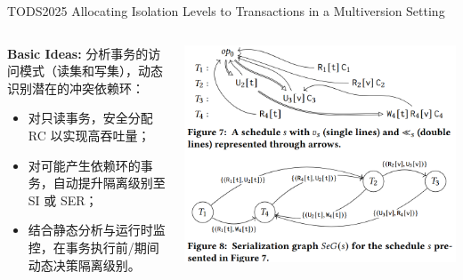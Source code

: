 \begin{frame}{TODS2025 Allocating Isolation Levels to Transactions in a Multiversion Setting}
	\begin{columns}
		\begin{column}{0.5\textwidth}
			\textbf{Basic Ideas: }分析事务的访问模式（读集和写集），动态识别潜在的冲突依赖环：
			\begin{itemize}
				\item 对只读事务，安全分配 RC 以实现高吞吐量；
				\item 对可能产生依赖环的事务，自动提升隔离级别至 SI 或 SER；
				\item 结合静态分析与运行时监控，在事务执行前/期间动态决策隔离级别。
			\end{itemize}
		\end{column}
		\begin{column}{0.5\textwidth}
			\includegraphics[width=0.98\linewidth]{figs/confliction-detect}
		\end{column}
	\end{columns}
\end{frame}

